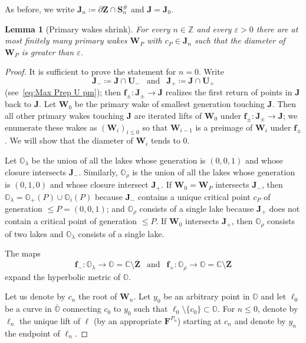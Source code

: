 \documentclass{amsart}
\renewcommand{\sp}{{\ \ }}
\newcommand{\1}{{\mathbb 1 }}
\newcommand{\bO}{{\mathbb{O}}}
\newcommand{\bF}{{\mathbf F}}
\newcommand{\bZ}{{\mathbf Z}}
\newcommand{\bW}{{\mathbf W}}
\newcommand{\bJ}{{\mathbf J}}
\newcommand{\bS}{{\mathbf S}}
\newcommand{\bU}{{\mathbf U}}
\newcommand{\bbf}{{\mathbf f}}
\newcommand{\C}{\mathbb{C}}
\newcommand{\Z}{\mathbb{Z}}
\newtheorem{lem}[thm]{Lemma}
\theoremstyle{remark}
\numberwithin{equation}{section}
\theoremstyle{definition}
\theoremstyle{nonumberbreak}
\begin{document}
As before, we write $\bJ_n\coloneqq \partial \bZ\cap\bS^\#_n$ and $\bJ=\bJ_0$.
\begin{lem}[Primary wakes shrink]
\label{lem:wake shrinks}
For every $n\in \Z$ and every $\varepsilon>0$ there are at most finitely many primary wakes $\bW_P$ with $c_P\in \bJ_n$ such that the diameter of $\bW_P$ is greater than $\varepsilon$.
\end{lem}
\begin{proof}
It is sufficient to prove the statement for $n=0$. Write \[\bJ_-\coloneqq \bJ\cap \bU_- \sp \text{ and }\sp    \bJ_+\coloneqq \bJ\cap \bU_+  \]
(see~\eqref{eq:Max Prep U pm}); then $\bbf_{\pm}\colon \bJ_\pm \to \bJ$ realizes the first return of points in $\bJ$ back to $\bJ$. Let $\bW_{0}$ be the primary wake of smallest generation touching $\bJ$. Then all other primary wakes touching $\bJ$ are iterated lifts of $\bW_{0}$ under $\bbf_{\pm}\colon \bJ_\pm \to \bJ$; we enumerate these wakes as $(\bW_i)_{i\le 0}$ so that $\bW_{i-1}$ is a preimage of $\bW_i$ under $\bbf_\pm$. We will show that the diameter of $\bW_i$ tends to $0$.


 

 Let $\bO_\lambda$ be the union of all the lakes whose generation is $(0,0,1)$ and whose closure intersects $\bJ_-$. Similarly, $\bO_\rho$ is the union of all the lakes whose generation is $(0,1,0)$ and whose closure intersect $\bJ_+$. If $\bW_0=\bW_P$ intersects $\bJ_-$, then $\bO_\lambda=\bO_+(P)\cup \bO_i(P)$ because $\bJ_-$ contains a unique critical point $c_P$ of generation $\le P=(0,0,1)$; and $\bO_\rho$ consists of a single lake because $\bJ_+$ does not contain a critical point of generation $\le P$. If $\bW_0$ intersects $\bJ_+$, then $\bO_\rho$ consists of two lakes and $\bO_\lambda$ consists of a single lake.
 
  
The maps
\begin{equation}
\label{eq:prf:lem:wake shrinks}
\bbf_-\colon \bO_\lambda\to \bO=\C\setminus \overline \bZ \sp \text{ and }\sp \bbf_+\colon \bO_\rho \to \bO=\C\setminus \overline \bZ
\end{equation}
expand the hyperbolic metric of $\bO$.



Let us denote by $c_n$ the root of $\bW_n$. Let $y_0$ be an arbitrary point in $\bO$ and let $\ell_0$ be a curve in $\overline \bO$ connecting $c_0$ to $y_0$ such that $\ell_0\setminus\{c_0\}\subset \bO$. For $n\le 0$, denote by $\ell_n$ the unique lift of $\ell$ (by an appropriate $\bF^{P_n}$) starting at $c_n$ and denote by $y_n$ the endpoint of $\ell_n$.


\end{proof}
\end{document}
